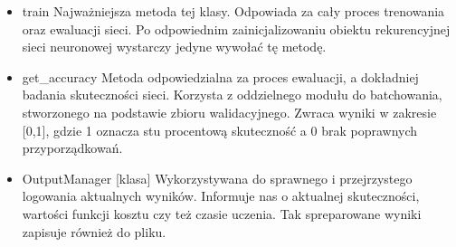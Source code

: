 \begin{itemize}

  \item{train}
  \newline Najważniejsza metoda tej klasy. Odpowiada za cały proces trenowania oraz ewaluacji sieci. Po 
  odpowiednim zainicjalizowaniu obiektu rekurencyjnej sieci neuronowej wystarczy jedyne wywołać tę metodę.
  \item{get\_accuracy}
  \newline Metoda odpowiedzialna za proces ewaluacji, a dokładniej badania skuteczności sieci. Korzysta z 
  oddzielnego modułu do batchowania, stworzonego na podstawie zbioru walidacyjnego. Zwraca wyniki w zakresie
  [0,1], gdzie 1 oznacza stu procentową skuteczność a 0 brak poprawnych przyporządkowań.
  \item{OutputManager [klasa]}
  \newline Wykorzystywana do sprawnego i przejrzystego logowania aktualnych wyników. Informuje nas o aktualnej
  skuteczności, wartości funkcji kosztu czy też czasie uczenia. Tak spreparowane wyniki zapisuje również do pliku.

\end{itemize}